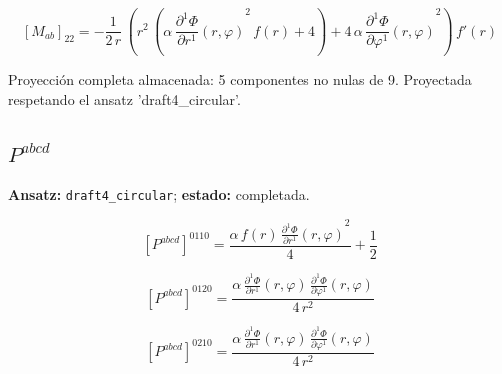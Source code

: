 \documentclass[11pt]{article}
\begin{document}
\par\smallskip
\begin{dmath*}[breakdepth={5}]
\left[M_{ab}\right]_{22} = -\frac{1}{2\,r}\,\left({r}^{2}\,\left(\alpha\,{\frac{\partial^{1} \Phi}{\partial r^{1}}\!\left(r, \varphi\right)}^{2}\,f\!\left(r\right) + 4\right) + 4\,\alpha\,{\frac{\partial^{1} \Phi}{\partial \varphi^{1}}\!\left(r, \varphi\right)}^{2}\right)\,f'\!\left(r\right)
\end{dmath*}
\par\smallskip
Proyección completa almacenada: 5 componentes no nulas de 9. Proyectada respetando el ansatz 'draft4\_circular'.\par\medskip
{}
\subsection*{$ P^{abcd} $}
\textbf{Ansatz:} \texttt{draft4\_circular}; \textbf{estado:} completada.\par
\begin{dmath*}[breakdepth={5}]
\left[P^{abcd}\right]^{0110} = \frac{\alpha\,f\!\left(r\right)\,{\frac{\partial^{1} \Phi}{\partial r^{1}}\!\left(r, \varphi\right)}^{2}}{4} + \frac{1}{2}
\end{dmath*}
\par\smallskip
\begin{dmath*}[breakdepth={5}]
\left[P^{abcd}\right]^{0120} = \frac{\alpha\,\frac{\partial^{1} \Phi}{\partial r^{1}}\!\left(r, \varphi\right)\,\frac{\partial^{1} \Phi}{\partial \varphi^{1}}\!\left(r, \varphi\right)}{4\,{r}^{2}}
\end{dmath*}
\par\smallskip
\begin{dmath*}[breakdepth={5}]
\left[P^{abcd}\right]^{0210} = \frac{\alpha\,\frac{\partial^{1} \Phi}{\partial r^{1}}\!\left(r, \varphi\right)\,\frac{\partial^{1} \Phi}{\partial \varphi^{1}}\!\left(r, \varphi\right)}{4\,{r}^{2}}
\end{dmath*}
\end{document}
